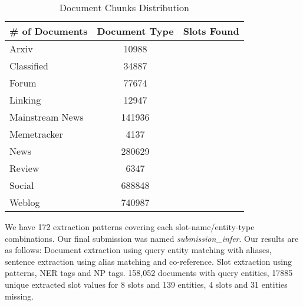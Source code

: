 
\begin{table}[b]
\caption{Document Chunks Distribution }
\centering
\label{table:documentsDist}

\begin{tabular}{|l|c|c|}
\hline 
\textbf{\# of Documents} & \textbf{Document Type} & \textbf{Slots Found}\\ 
\hline 
	Arxiv & 10988 & \\ \hline
 Classified & 34887 & \\ \hline
 Forum & 77674 & \\ \hline
 Linking & 12947 & \\ \hline
 Mainstream News & 141936 & \\ \hline
 Memetracker & 4137 & \\ \hline
 News & 280629 & \\ \hline
 Review & 6347 & \\ \hline
 	 Social & 688848 & \\ \hline
 Weblog & 740987 & \\ \hline

  
\hline 
\end{tabular} 
\end{table}


 
 
 
We have 172 extraction patterns covering each slot-name/entity-type combinations. Our final submission was named \textit{submission\_infer}. Our results are as follows: Document extraction using query entity matching with aliases, sentence extraction using alias matching and co-reference. Slot extraction using patterns, NER tags and NP tags. 158,052 documents with query entities, 17885 unique extracted slot values for 8 slots and 139 entities, 4 slots and 31 entities missing.

